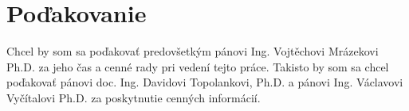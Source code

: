 \documentclass[slovak]{ExcelAtFIT} %
\begin{document}
\section*{Poďakovanie}
Chcel by som sa poďakovať predovšetkým pánovi Ing. Vojtěchovi Mrázekovi Ph.D. za jeho čas a cenné rady pri vedení tejto práce. Takisto by som sa chcel poďakovať pánovi doc. Ing. Davidovi Topolankovi, Ph.D. a pánovi  Ing. Václavovi Vyčítalovi Ph.D. za poskytnutie cenných informácií.




\end{document}
